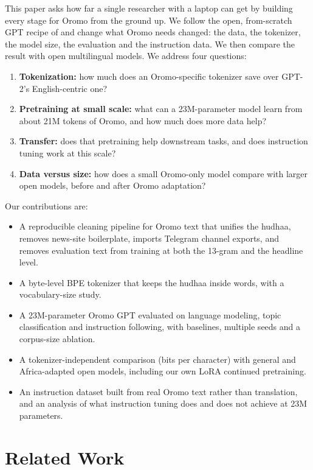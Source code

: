 \documentclass[11pt]{article}
\begin{document}
This paper asks how far a single researcher with a laptop can get by building every stage for Oromo from the ground up. We follow the open, from-scratch GPT recipe of \citet{raschka2025build} and change what Oromo needs changed: the data, the tokenizer, the model size, the evaluation and the instruction data. We then compare the result with open multilingual models. We address four questions:
\begin{enumerate}
\item \textbf{Tokenization:} how much does an Oromo-specific tokenizer save over GPT-2's English-centric one?
\item \textbf{Pretraining at small scale:} what can a 23M-parameter model learn from about 21M tokens of Oromo, and how much does more data help?
\item \textbf{Transfer:} does that pretraining help downstream tasks, and does instruction tuning work at this scale?
\item \textbf{Data versus size:} how does a small Oromo-only model compare with larger open models, before and after Oromo adaptation?
\end{enumerate}

\noindent Our contributions are:
\begin{itemize}
\item A reproducible cleaning pipeline for Oromo text that unifies the hudhaa, removes news-site boilerplate, imports Telegram channel exports, and removes evaluation text from training at both the 13-gram and the headline level.
\item A byte-level BPE tokenizer that keeps the hudhaa inside words, with a vocabulary-size study.
\item A 23M-parameter Oromo GPT evaluated on language modeling, topic classification and instruction following, with baselines, multiple seeds and a corpus-size ablation.
\item A tokenizer-independent comparison (bits per character) with general and Africa-adapted open models, including our own LoRA continued pretraining.
\item An instruction dataset built from real Oromo text rather than translation, and an analysis of what instruction tuning does and does not achieve at 23M parameters.
\end{itemize}

\section{Related Work}
\end{document}
